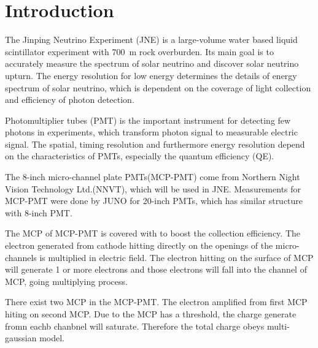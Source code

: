 \section{Introduction}
The Jinping Neutrino Experiment (JNE)\cite{} is a large-volume water based liquid scintillator experiment with \SI{700}{m} rock overburden. Its main goal is to accurately measure the spectrum of solar neutrino and discover solar neutrino upturn\cite{}. The energy resolution for low energy determines the details of energy spectrum of solar neutrino, which is dependent on the coverage of light collection and efficiency of photon detection.

Photomultiplier tubes (PMT) is the important instrument for detecting few photons in experiments, which transform photon signal to measurable electric signal. The spatial, timing resolution and furthermore energy resolution depend on the characteristics of PMTs, especially the quantum efficiency (QE). 

The 8-inch micro-channel plate PMTs(MCP-PMT) come from Northern Night Vision Technology Ltd.(NNVT), which will be used in JNE. Measurements for MCP-PMT were done by JUNO for 20-inch PMTs, which has similar structure with 8-inch PMT\cite{}.


The MCP of MCP-PMT is covered with  to boost the collection efficiency. The electron generated from cathode hitting directly on the openings of the micro-channels is multiplied in electric field. The electron hitting on the surface of MCP will generate 1 or more electrons and those electrons will fall into the channel of MCP, going multiplying process.

There exist two MCP in the MCP-PMT. The electron amplified from first MCP hiting on second MCP. Due to the MCP has a threshold, the charge generate fromn eachb chanbnel will saturate. Therefore the total charge obeys multi-gaussian model.